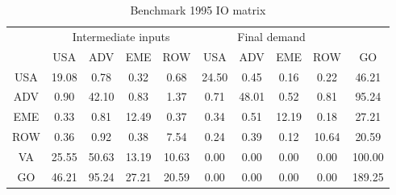 \begin{table}[p]
\begin{center}
\caption{Benchmark 1995 IO matrix}
\label{tab:iomat-bench-1995}
\small
\begin{tabular}{cccccccccc}
\toprule
& \multicolumn{4}{c}{Intermediate inputs}& \multicolumn{4}{c}{Final demand} & \\
\cmidrule(rl){2-5}\cmidrule(rl){6-9}
 &USA &ADV &EME &ROW &USA &ADV &EME &ROW& GO\\
\midrule
USA& 19.08& 0.78& 0.32& 0.68& 24.50& 0.45& 0.16& 0.22& 46.21 \\
ADV& 0.90& 42.10& 0.83& 1.37& 0.71& 48.01& 0.52& 0.81& 95.24 \\
EME& 0.33& 0.81& 12.49& 0.37& 0.34& 0.51& 12.19& 0.18& 27.21 \\
ROW& 0.36& 0.92& 0.38& 7.54& 0.24& 0.39& 0.12& 10.64& 20.59 \\
\midrule
VA& 25.55& 50.63& 13.19& 10.63& 0.00& 0.00& 0.00& 0.00& 100.00\\
\midrule
GO& 46.21& 95.24& 27.21& 20.59& 0.00& 0.00& 0.00& 0.00& 189.25\\
\bottomrule
\end{tabular}
\normalsize
\end{center}
\end{table}
